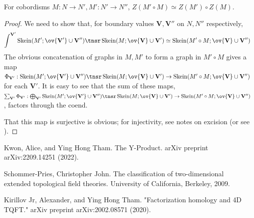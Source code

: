 \documentclass[12pt]{article}
\newcommand{\VV}{{\mathbf{V}}}
\DeclareMathOperator{\Skein}{Skein}
\begin{document}
\begin{proposition}
\label{p:1-cobord-compose}
For cobordisms $M: N \to N', M': N' \to N''$,
$Z(M' \circ M) \simeq Z(M') \circ Z(M)$.
\end{proposition}

\begin{proof}
We need to show that, for boundary values
$\VV,\VV''$ on $N,N''$ respectively,
\[
\int^{\VV'} \Skein(M';\ov{\VV'} \cup \VV'')
\tnsr \Skein(M; \ov{\VV} \cup \VV')
\simeq \Skein(M' \circ M; \ov{\VV} \cup \VV'')
\]
The obvious concatenation of graphs
in $M,M'$ to form a graph in $M' \circ M$
gives a map
$\Phi_{\VV'}: \Skein(M';\ov{\VV'} \cup \VV'')
\tnsr \Skein(M; \ov{\VV} \cup \VV')
\to \Skein(M' \circ M; \ov{\VV} \cup \VV'')$
for each $\VV'$.
It is easy to see that the sum of these maps,
$\sum_{\VV'} \Phi_{\VV'}:
\bigoplus_{\VV'} \Skein(M';\ov{\VV'} \cup \VV'')
\tnsr \Skein(M; \ov{\VV} \cup \VV')
\to \Skein(M' \circ M; \ov{\VV} \cup \VV'')$,
factors through the coend.

That this map is surjective is obvious;
for injectivity, see notes on excision
(or see \cite{KT}).
\end{proof}


\begin{thebibliography}{1}

 Kwon, Alice, and Ying Hong Tham. The Y-Product. arXiv preprint arXiv:2209.14251 (2022).

 Schommer-Pries, Christopher John. The classification of two-dimensional extended topological field theories. University of California, Berkeley, 2009.

 Kirillov Jr, Alexander, and Ying Hong Tham. "Factorization homology and 4D TQFT." arXiv preprint arXiv:2002.08571 (2020).

\end{thebibliography}
\end{document}
